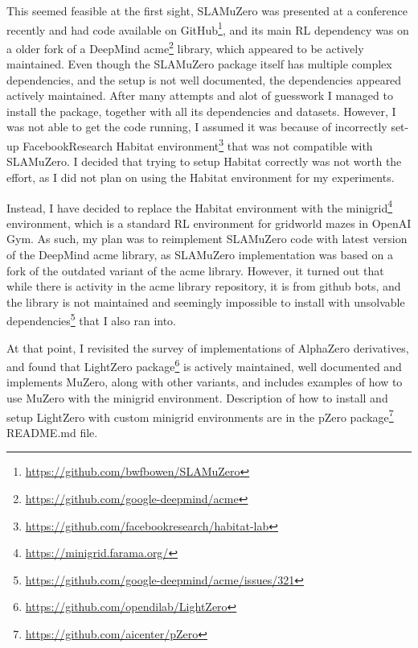 \documentclass[12pt]{article}
\begin{document}
This seemed feasible at the first sight, SLAMuZero was presented at a conference recently and had code available on GitHub\footnote{\url{https://github.com/bwfbowen/SLAMuZero}}, and its main RL dependency was on a older fork of a DeepMind acme\footnote{\url{https://github.com/google-deepmind/acme}} library, which appeared to be actively maintained. Even though the SLAMuZero package itself has multiple complex dependencies, and the setup is not well documented, the dependencies appeared actively maintained. After many attempts and alot of guesswork I managed to install the package, together with all its dependencies and datasets. However, I was not able to get the code running, I assumed it was because of incorrectly set-up FacebookResearch Habitat environment\footnote{\url{https://github.com/facebookresearch/habitat-lab}} that was not compatible with SLAMuZero. I decided that trying to setup Habitat correctly was not worth the effort, as I did not plan on using the Habitat environment for my experiments.

Instead, I have decided to replace the Habitat environment with the minigrid\footnote{\url{https://minigrid.farama.org/}} environment, which is a standard RL environment for gridworld mazes in OpenAI Gym. As such, my plan was to reimplement SLAMuZero code with latest version of the DeepMind acme library, as SLAMuZero implementation was based on a fork of the outdated variant of the acme library. However, it turned out that while there is activity in the acme library repository, it is from github bots, and the library is not maintained and seemingly impossible to install with unsolvable dependencies\footnote{\url{https://github.com/google-deepmind/acme/issues/321}} that I also ran into.

At that point, I revisited the survey of implementations of AlphaZero derivatives, and found that LightZero package\footnote{\url{https://github.com/opendilab/LightZero}} is actively maintained, well documented and implements MuZero, along with other variants, and includes examples of how to use MuZero with the minigrid environment. Description of how to install and setup LightZero with custom minigrid environments are in the pZero package\footnote{\url{https://github.com/aicenter/pZero}} README.md file.
\end{document}
